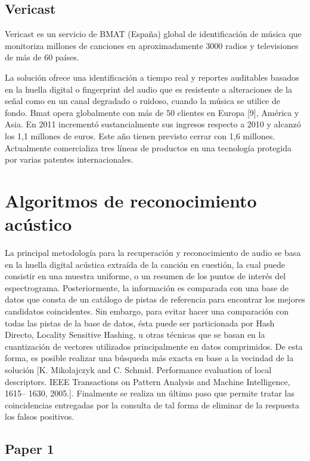 \subsection{Vericast}
Vericast es un servicio de BMAT (España) global de identificación de música que monitoriza millones de canciones en aproximadamente 3000 radios y televisiones de más de 60 países.

\bigskip

La solución ofrece una identificación a tiempo real y reportes auditables basados en la huella digital o fingerprint del audio que es resistente a alteraciones de la señal como en un canal degradado o ruidoso, cuando la música se utilice de fondo.
Bmat opera globalmente con más de 50 clientes en Europa [9], América y Asia. En 2011 incrementó sustancialmente sus ingresos respecto a 2010 y alcanzó los 1,1 millones de euros. Este año tienen previsto cerrar con 1,6 millones. Actualmente comercializa tres líneas de productos en una tecnología protegida por varias patentes internacionales.


\section{Algoritmos de reconocimiento acústico}

La principal metodología para la recuperación y reconocimiento de audio se basa en la huella digital acústica extraída de la canción en cuestión, la cual puede consistir en una muestra uniforme, o un resumen de los puntos de interés del espectrograma. 
Posteriormente, la información es comparada con una base de datos que consta de un catálogo de pistas de referencia para encontrar los mejores candidatos coincidentes. 
Sin embargo, para evitar hacer una comparación con todas las pistas de la base de datos, ésta puede ser particionada por Hash Directo, Locality Sensitive Hashing, u otras técnicas que se basan en la cuantización de vectores utilizados principalmente en datos comprimidos. De esta forma, es posible realizar una búsqueda más exacta en base a la vecindad de la solución [K. Mikolajczyk and C. Schmid. Performance evaluation of local descriptors. IEEE Transactions on Pattern Analysis and Machine Intelligence, 1615– 1630, 2005.].
Finalmente se realiza un último paso que permite tratar las coincidencias entregadas por la consulta de tal forma de eliminar de la respuesta los falsos positivos. 


\subsection{Paper 1}
\lipsum[2-4]

